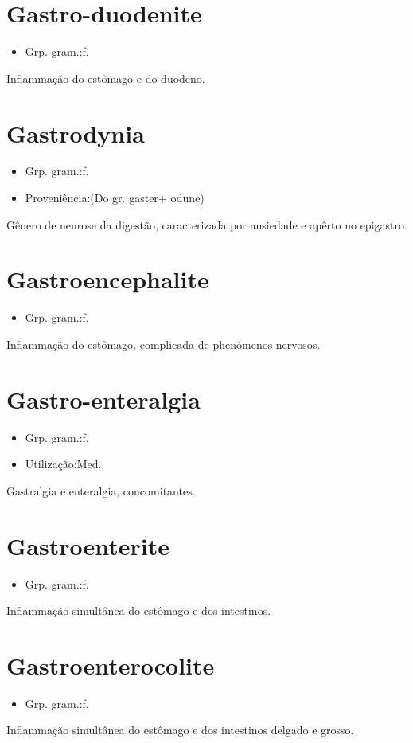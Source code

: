 \section{Gastro-duodenite}
\begin{itemize}
\item {Grp. gram.:f.}
\end{itemize}
Inflammação do estômago e do duodeno.
\section{Gastrodynia}
\begin{itemize}
\item {Grp. gram.:f.}
\end{itemize}
\begin{itemize}
\item {Proveniência:(Do gr. \textunderscore gaster\textunderscore  + \textunderscore odune\textunderscore )}
\end{itemize}
Gênero de neurose da digestão, caracterizada por ansiedade e apêrto no epigastro.
\section{Gastroencephalite}
\begin{itemize}
\item {Grp. gram.:f.}
\end{itemize}
Inflammação do estômago, complicada de phenómenos nervosos.
\section{Gastro-enteralgia}
\begin{itemize}
\item {Grp. gram.:f.}
\end{itemize}
\begin{itemize}
\item {Utilização:Med.}
\end{itemize}
Gastralgia e enteralgia, concomitantes.
\section{Gastroenterite}
\begin{itemize}
\item {Grp. gram.:f.}
\end{itemize}
Inflammação simultânea do estômago e dos intestinos.
\section{Gastroenterocolite}
\begin{itemize}
\item {Grp. gram.:f.}
\end{itemize}
Inflammação simultânea do estômago e dos intestinos delgado e grosso.
